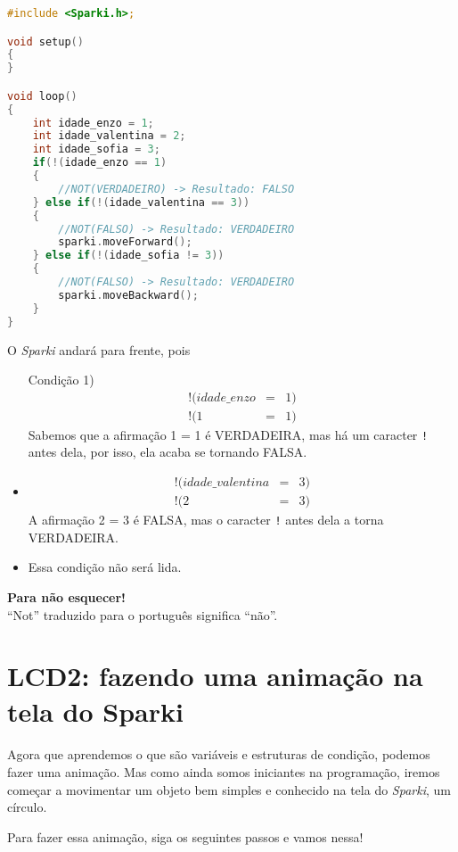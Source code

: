    \begin{lstlisting}[language=C]
#include <Sparki.h>;

void setup()
{
}

void loop()
{
    int idade_enzo = 1;
    int idade_valentina = 2;
    int idade_sofia = 3;
    if(!(idade_enzo == 1) 
    {
        //NOT(VERDADEIRO) -> Resultado: FALSO
    } else if(!(idade_valentina == 3)) 
    {
        //NOT(FALSO) -> Resultado: VERDADEIRO
        sparki.moveForward();
    } else if(!(idade_sofia != 3)) 
    {
        //NOT(FALSO) -> Resultado: VERDADEIRO
        sparki.moveBackward();
    }
}
\end{lstlisting}

    O \textsl{Sparki} andará para frente, pois
    \begin{itemize}
        \item[Condição 1)]
        \begin{eqnarray}
        !(idade\_enzo & = & 1)\\
        !(1 & = & 1) \nonumber         \end{eqnarray}
        Sabemos que a afirmação 1 = 1 é VERDADEIRA, mas há um caracter \lstinline[columns=fixed]{!} antes dela, por isso, ela acaba se tornando FALSA.
        \item[Condição 2)]
        \begin{eqnarray}
        !(idade\_valentina & = & 3)\\
        !(2 & = & 3) \nonumber
        \end{eqnarray}
        A afirmação 2 = 3 é FALSA, mas o caracter \lstinline[columns=fixed]{!} antes dela a torna VERDADEIRA.
        \item[Condição 3)] Essa condição não será lida.
    \end{itemize}
    
    \begin{center}
        \textcolor{mydarkblue}{\textbf{Para não esquecer!}}
        \\``Not'' traduzido para o português significa ``não''.
    \end{center}

\section{LCD2: fazendo uma animação na tela do Sparki}

    \paragraph{}
    Agora que aprendemos o que são variáveis e estruturas de condição, podemos fazer uma animação. Mas como ainda somos iniciantes na programação, iremos começar a movimentar um objeto bem simples e conhecido na tela do \textsl{Sparki}, um círculo.\par
    Para fazer essa animação, siga os seguintes passos e vamos nessa!
    
